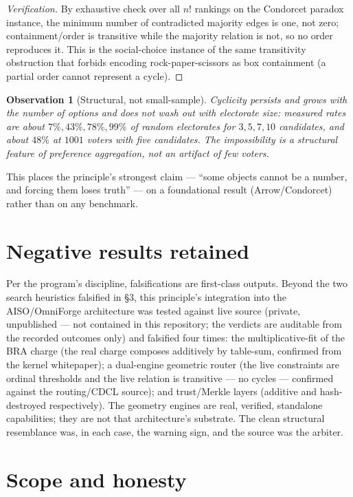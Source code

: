 \documentclass[11pt]{article}
\newtheorem{observation}{Observation}
\begin{document}
\begin{proof}[Verification]
By exhaustive check over all $n!$ rankings on the Condorcet paradox instance, the minimum number of
contradicted majority edges is one, not zero; containment/order is transitive while the majority relation is
not, so no order reproduces it. This is the social-choice instance of the same transitivity obstruction that
forbids encoding rock-paper-scissors as box containment (a partial order cannot represent a cycle).
\end{proof}

\begin{observation}[Structural, not small-sample]
Cyclicity persists and grows with the number of options and does not wash out with electorate size:
measured rates are about $7\%,43\%,78\%,99\%$ of random electorates for $3,5,7,10$ candidates, and about
$48\%$ at $1001$ voters with five candidates. The impossibility is a structural feature of preference
aggregation, not an artifact of few voters.
\end{observation}

This places the principle's strongest claim --- ``some objects cannot be a number, and forcing them loses
truth'' --- on a foundational result (Arrow/Condorcet) rather than on any benchmark.

\section{Negative results retained}

Per the program's discipline, falsifications are first-class outputs. Beyond the two search heuristics
falsified in \S3, this principle's integration into the AISO/OmniForge architecture was tested against live
source (private, unpublished --- not contained in this repository; the verdicts are auditable from
the recorded outcomes only) and falsified four times: the multiplicative-fit of the BRA charge (the real charge composes
additively by table-sum, confirmed from the kernel whitepaper); a dual-engine geometric router (the live
constraints are ordinal thresholds and the live relation is transitive --- no cycles --- confirmed against
the routing/CDCL source); and trust/Merkle layers (additive and hash-destroyed respectively). The geometry
engines are real, verified, standalone capabilities; they are not that architecture's substrate. The clean
structural resemblance was, in each case, the warning sign, and the source was the arbiter.

\section{Scope and honesty}
\end{document}
